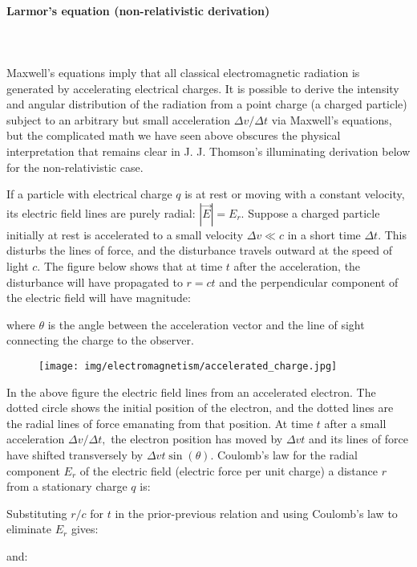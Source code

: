 	\paragraph{Larmor's equation (non-relativistic derivation)}\label{Larmor equation classical derivation}\mbox{}\\\\
	Maxwell's equations imply that all classical electromagnetic radiation is generated by accelerating electrical charges. It is possible to derive the intensity and angular distribution of the radiation from a point charge (a charged particle) subject to an arbitrary but small acceleration $\Delta v / \Delta t$ via Maxwell's equations, but the complicated math we have seen above obscures the physical interpretation that remains clear in J. J. Thomson's illuminating derivation below for the non-relativistic case.

	If a particle with electrical charge $q$ is at rest or moving with a constant velocity, its electric field lines are purely radial: $|\vec{E}|=E_{r}$. Suppose a charged particle initially at rest is accelerated to a small velocity $\Delta v \ll c$ in a short time $\Delta t$. This disturbs the lines of force, and the disturbance travels outward at the speed of light $c$. The figure below shows that at time $t$ after the acceleration, the disturbance will have propagated to $r=c t$ and the perpendicular component of the electric field will have magnitude:
	
	where $\theta$ is the angle between the acceleration vector and the line of sight connecting the charge to the observer.
	\begin{figure}[H]
		\centering
		\texttt{[image: img/electromagnetism/accelerated\_charge.jpg]}
	\end{figure} 
	In the above figure the electric field lines from an accelerated electron. The dotted circle shows the initial position of the electron, and the dotted lines are the radial lines of force emanating from that position. At time $t$ after a small acceleration $\Delta v / \Delta t,$ the electron position has moved by $\Delta v t$ and its lines of force have shifted transversely by $\Delta v t \sin (\theta)$.
Coulomb's law for the radial component $E_{r}$ of the electric field (electric force per unit charge) a distance $r$ from a stationary charge $q$ is:
	
	Substituting $r / c$ for $t$ in the prior-previous relation and using Coulomb's law to eliminate $E_{r}$ gives:
	
	and:
	
